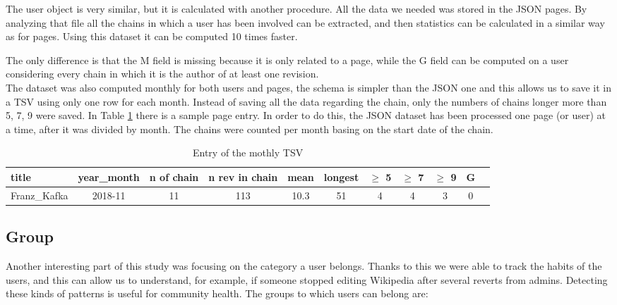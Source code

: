 The user object is very similar, but it is calculated with another procedure. All the data we needed
was stored in the JSON pages. By analyzing that file all the chains in which a user has been
involved can be extracted, and then statistics can be calculated in a similar way as for pages.
Using this dataset it can be computed 10 times faster.  

The only difference is that the M field is missing because it is only related to a page, while the G field
can be computed on a user considering every chain in which it is the author of at least one revision.\\

The dataset was also computed monthly for both users and pages, the schema is simpler than the
JSON one and this allows us to save it in a TSV using only one row for each month. Instead of saving
all the data regarding the chain, only the numbers of chains longer more than 5, 7, 9 were saved. In
Table \ref{table:chainsPagemonth} there is a sample page entry. In order to do this, the JSON
dataset has been processed one page (or user) at a time, after it was divided by month. The chains
were counted per month basing on the start date of the chain.   

\begin{table}[H]
    \centering
    \begin{tabularx}{\columnwidth}{@{}Xcccccccccc@{}}
        \midrule
        \textbf{title} & \textbf{year\_month} & \textbf{n of chain} & \textbf{n rev in chain} & \textbf{mean} & \textbf{longest} & \textbf{$\geq$ 5} & \textbf{$\geq$ 7} & \textbf{$\geq$ 9} & \textbf{G}\\ \toprule
        Franz\_Kafka & 2018-11 & 11 & 113 & 10.3 & 51 & 4 & 4 & 3 & 0\\
        
        \bottomrule
    \end{tabularx}
    
    \caption{Entry of the mothly TSV \label{table:chainsPagemonth}}
\end{table}


\subsection{Group}
Another interesting part of this study was focusing on the category a user belongs. Thanks to this
we were able to track the habits of the users, and this can allow us to understand, for example, if
someone stopped editing Wikipedia after several reverts from admins. Detecting these kinds of
patterns is useful for community health. The groups to which users can belong are: 


